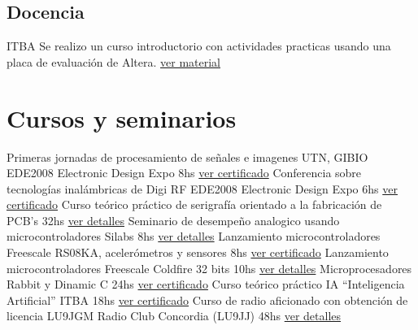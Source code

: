 \documentclass[11pt,a4paper,sans]{moderncv} 	%
\begin{document}
	\subsection{Docencia}
	 	{ITBA} 		{}{}{Se realizo un curso introductorio con actividades practicas usando una placa de evaluación de Altera. \href{http://disenioconingenio.com.ar/shop/docs/fpga.pdf} {ver material}}


\section{Cursos y seminarios}
 		{Primeras jornadas de procesamiento de señales e imagenes}			{UTN, GIBIO EDE2008 Electronic Design Expo} 	{8hs}  	{\href{http://disenioconingenio.com.ar/producto.php?products_id=396}{ver certificado}} 	{}{}
 		{Conferencia sobre tecnologías inalámbricas de Digi RF}				{EDE2008 Electronic Design Expo} 		{6hs}  	{\href{http://disenioconingenio.com.ar/producto.php?products_id=394}{ver certificado}} 	{}{}
 		{Curso teórico práctico de serigrafía orientado a la fabricación de PCB's}	{32hs} 				 			{\href{http://disenioconingenio.com.ar/producto.php?products_id=389}{ver detalles}} 	{}{}
 		{Seminario de desempeño analogico usando microcontroladores Silabs}		{8hs} 				 			{\href{http://disenioconingenio.com.ar/producto.php?products_id=395}{ver detalles}} 	{}{}
 		{Lanzamiento microcontroladores Freescale RS08KA, acelerómetros y sensores} 	{8hs} 							{\href{http://disenioconingenio.com.ar/producto.php?products_id=384}{ver certificado}} 	{}{}
 		{Lanzamiento microcontroladores Freescale Coldfire 32 bits} 			{10hs}			 				{\href{http://disenioconingenio.com.ar/producto.php?products_id=385}{ver detalles}} 	{}{}
 		{Microprocesadores Rabbit y Dinamic C} 						{24hs}			 				{\href{http://disenioconingenio.com.ar/producto.php?products_id=386}{ver certificado}} 	{}{}
 		{Curso teórico práctico IA “Inteligencia Artificial”} 				{ITBA} 						{18hs} 	{\href{http://disenioconingenio.com.ar/producto.php?products_id=387}{ver certificado}} 	{}{}
 		{Curso de radio aficionado con obtención de licencia LU9JGM} 			{Radio Club Concordia (LU9JJ)} 			{48hs} 	{\href{http://disenioconingenio.com.ar/producto.php?products_id=388}{ver detalles}} 	{}{}
\end{document}
